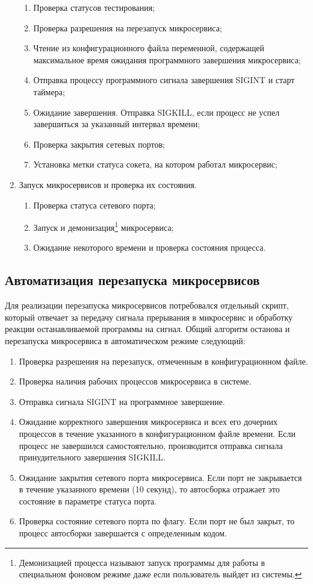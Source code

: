 \begin{enumerate}
	\begin{enumerate}
		\item Проверка статусов тестирования;
		\item Проверка разрешения на перезапуск микросервиса;
		\item Чтение из конфигурационного файла переменной, содержащей максимальное время ожидания программного завершения микросервиса;
		\item Отправка процессу программного сигнала завершения SIGINT и старт таймера;
		\item Ожидание завершения. Отправка SIGKILL, если процесс не успел завершиться за указанный интервал времени;
		\item Проверка закрытия сетевых портов;
		\item Установка метки статуса сокета, на котором работал микросервис;
	\end{enumerate}
	\item Запуск микросервисов и проверка их состояния.
	\begin{enumerate}
		\item Проверка статуса сетевого порта;
		\item Запуск и демонизация\footnote{Демонизацией процесса называют запуск программы для работы в специальном фоновом режиме даже если пользователь выйдет из системы.} микросервиса;
		\item Ожидание некоторого времени и проверка состояния процесса.
	\end{enumerate}
\end{enumerate}


\subsection{Автоматизация перезапуска микросервисов}

Для реализации перезапуска микросервисов потребовался отдельный скрипт, который отвечает за передачу сигнала прерывания в микросервис и обработку реакции останавливаемой программы на сигнал.
Общий алгоритм останова и перезапуска микросервиса в автоматическом режиме следующий:
\begin{enumerate}
 	\item Проверка разрешения на перезапуск, отмеченным в конфигурационном файле.
 	\item Проверка наличия рабочих процессов микросервиса в системе.
 	\item Отправка сигнала SIGINT на программное завершение.
 	\item Ожидание корректного завершения микросервиса и всех его дочерних процессов в течение указанного в конфигурационном файле времени. Если процесс не завершился самостоятельно, производится отправка сигнала принудительного завершения SIGKILL.
 	\item Ожидание закрытия сетевого порта микросервиса. Если порт не закрывается в течение указанного времени (10 секунд), то автосборка отражает это состояние в параметре статуса порта. 
 	\item Проверка состояние сетевого порта по флагу. Если порт не был закрыт, то процесс автосборки завершается с определенным кодом. 	
\end{enumerate}

